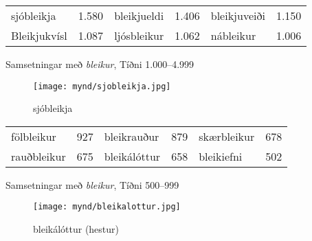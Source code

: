 \documentclass[../samsetningasafn.tex]{subfiles}
\begin{document}
\begin{wordlist}[H]
\begin{tcolorbox}

	\setlength{\extrarowheight}{3pt}
	\begin{tabular}{BlBlBl}
		sjóbleikja		& 1.580		& 		
		bleikjueldi		& 1.406		& 		
		bleikjuveiði		& 1.150		\\ 	
		Bleikjukvísl		& 1.087		& 		
		ljósbleikur		& 1.062		&   	
		nábleikur		& 1.006					
	\end{tabular}

\end{tcolorbox}
	\caption{Samsetningar með \textit{bleikur}, Tíðni 1.000--4.999}
	\label{listi:bleikt.1000}
\end{wordlist}

\begin{figure}[H]
\begin{tcolorbox}
\centering
	\texttt{[image: mynd/sjobleikja.jpg]}
\end{tcolorbox}
	\caption{sjóbleikja}
	\label{mynd:sjobleikja}
\end{figure}

\begin{wordlist}[H]
\begin{tcolorbox}

	\setlength{\extrarowheight}{3pt}
	\begin{tabular}{BlBlBl}
		fölbleikur		& 927		& 		
		bleikrauður		& 879		& 		
		skærbleikur		& 678		\\ 
		rauðbleikur		& 675		& 	
		bleikálóttur		& 658		&   	
		bleikiefni			& 502		 		
	\end{tabular}

\end{tcolorbox}
	\caption{Samsetningar með \textit{bleikur}, Tíðni 500--999}
	\label{listi:bleikt.500}
\end{wordlist}	

\begin{figure}[H]
\begin{tcolorbox}
\centering
	\texttt{[image: mynd/bleikalottur.jpg]}
\end{tcolorbox}
	\caption{bleikálóttur (hestur)}
	\label{mynd:bleikalottur}
\end{figure}	
		
\end{document}
